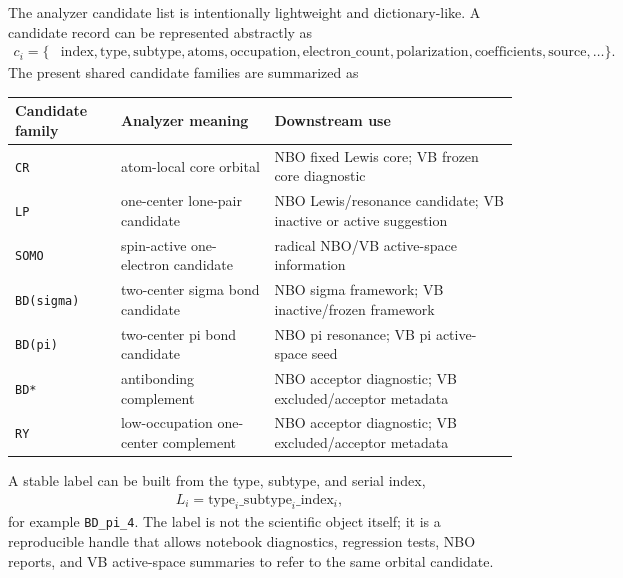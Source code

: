 \documentclass[11pt]{article}
\begin{document}
The analyzer candidate list is intentionally lightweight and dictionary-like.  A candidate record can be represented abstractly as
\begin{equation}
\begin{aligned}
	c_i = \{&\mathrm{index},\mathrm{type},\mathrm{subtype},\mathrm{atoms},
	\mathrm{occupation},\mathrm{electron\_count},
	\mathrm{polarization},\mathrm{coefficients},\mathrm{source},\ldots\}.
\end{aligned}
\end{equation}
The present shared candidate families are summarized as
\begin{center}
\begin{tabular}{lll}
\toprule
Candidate family & Analyzer meaning & Downstream use \\
\midrule
\texttt{CR} & atom-local core orbital & NBO fixed Lewis core; VB frozen core diagnostic \\
\texttt{LP} & one-center lone-pair candidate & NBO Lewis/resonance candidate; VB inactive or active suggestion \\
\texttt{SOMO} & spin-active one-electron candidate & radical NBO/VB active-space information \\
\texttt{BD(sigma)} & two-center sigma bond candidate & NBO sigma framework; VB inactive/frozen framework \\
\texttt{BD(pi)} & two-center pi bond candidate & NBO pi resonance; VB pi active-space seed \\
\texttt{BD*} & antibonding complement & NBO acceptor diagnostic; VB excluded/acceptor metadata \\
\texttt{RY} & low-occupation one-center complement & NBO acceptor diagnostic; VB excluded/acceptor metadata \\
\bottomrule
\end{tabular}
\end{center}

A stable label can be built from the type, subtype, and serial index,
\begin{equation}
\begin{aligned}
	L_i = \mathrm{type}_i\_\mathrm{subtype}_i\_\mathrm{index}_i,
\end{aligned}
\end{equation}
for example \texttt{BD\_pi\_4}.  The label is not the scientific object itself; it is a reproducible handle that allows notebook diagnostics, regression tests, NBO reports, and VB active-space summaries to refer to the same orbital candidate.
\end{document}
